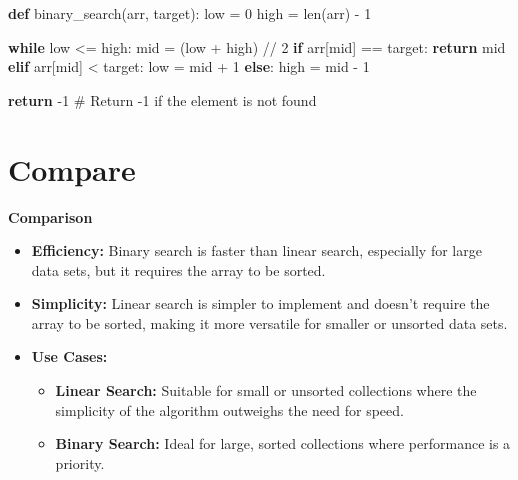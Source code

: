 \documentclass[
  letterpaper,
  DIV=11,
  numbers=noendperiod]{scrreprt}
\newenvironment{Shaded}{\begin{snugshade}}{\end{snugshade}}
\newcommand{\BuiltInTok}[1]{\textcolor[rgb]{0.00,0.23,0.31}{#1}}
\newcommand{\CommentTok}[1]{\textcolor[rgb]{0.37,0.37,0.37}{#1}}
\newcommand{\ControlFlowTok}[1]{\textcolor[rgb]{0.00,0.23,0.31}{\textbf{#1}}}
\newcommand{\DecValTok}[1]{\textcolor[rgb]{0.68,0.00,0.00}{#1}}
\newcommand{\KeywordTok}[1]{\textcolor[rgb]{0.00,0.23,0.31}{\textbf{#1}}}
\newcommand{\NormalTok}[1]{\textcolor[rgb]{0.00,0.23,0.31}{#1}}
\newcommand{\OperatorTok}[1]{\textcolor[rgb]{0.37,0.37,0.37}{#1}}
\providecommand{\tightlist}{%
  \setlength{\itemsep}{0pt}\setlength{\parskip}{0pt}}
\begin{document}
\begin{Shaded}
\begin{Highlighting}[]
\KeywordTok{def}\NormalTok{ binary\_search(arr, target):}
\NormalTok{    low }\OperatorTok{=} \DecValTok{0}
\NormalTok{    high }\OperatorTok{=} \BuiltInTok{len}\NormalTok{(arr) }\OperatorTok{{-}} \DecValTok{1}

    \ControlFlowTok{while}\NormalTok{ low }\OperatorTok{\textless{}=}\NormalTok{ high:}
\NormalTok{        mid }\OperatorTok{=}\NormalTok{ (low }\OperatorTok{+}\NormalTok{ high) }\OperatorTok{//} \DecValTok{2}
        \ControlFlowTok{if}\NormalTok{ arr[mid] }\OperatorTok{==}\NormalTok{ target:}
            \ControlFlowTok{return}\NormalTok{ mid}
        \ControlFlowTok{elif}\NormalTok{ arr[mid] }\OperatorTok{\textless{}}\NormalTok{ target:}
\NormalTok{            low }\OperatorTok{=}\NormalTok{ mid }\OperatorTok{+} \DecValTok{1}
        \ControlFlowTok{else}\NormalTok{:}
\NormalTok{            high }\OperatorTok{=}\NormalTok{ mid }\OperatorTok{{-}} \DecValTok{1}

    \ControlFlowTok{return} \OperatorTok{{-}}\DecValTok{1}  \CommentTok{\# Return {-}1 if the element is not found}
\end{Highlighting}
\end{Shaded}

\section{Compare}

\textbf{Comparison}

\begin{itemize}
\tightlist
\item
  \textbf{Efficiency:} Binary search is faster than linear search,
  especially for large data sets, but it requires the array to be
  sorted.
\item
  \textbf{Simplicity:} Linear search is simpler to implement and doesn't
  require the array to be sorted, making it more versatile for smaller
  or unsorted data sets.
\item
  \textbf{Use Cases:}

  \begin{itemize}
  \tightlist
  \item
    \textbf{Linear Search:} Suitable for small or unsorted collections
    where the simplicity of the algorithm outweighs the need for speed.
  \item
    \textbf{Binary Search:} Ideal for large, sorted collections where
    performance is a priority.
  \end{itemize}
\end{itemize}
\end{document}
